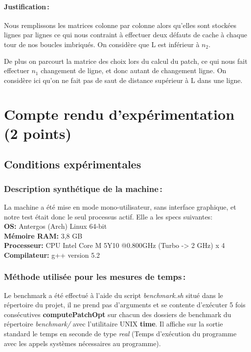 \documentclass[a4paper, 10pt, french]{article}
\begin{document}
    \paragraph{Justification\,: }
    Nous remplissons les matrices colonne par colonne alors qu'elles sont stockées lignes par lignes ce qui nous contraint à effectuer deux défauts de cache à chaque tour de nos boucles imbriqués. On considère que L est inférieur à $n_2$.

    De plus on parcourt la matrice des choix lors du calcul du patch, ce qui nous fait effectuer $n_1$ changement de ligne, et donc autant de changement ligne. On considère ici qu'on ne fait pas de saut de distance supérieur à L dans une ligne.

\section{Compte rendu d'expérimentation (2 points)}
  \subsection{Conditions expérimentales}

    \subsubsection{Description synthétique de la machine\,:}
    La machine a été mise en mode mono-utilisateur, sans interface graphique, et notre test était donc le seul processus actif. Elle a les specs suivantes: \\
    \textbf{OS:} Antergos (Arch) Linux 64-bit\\
    \textbf{Mémoire RAM:} 3,8 GB\\
    \textbf{Processeur:} CPU Intel Core M 5Y10 @0.800GHz (Turbo -> 2 GHz) x 4\\
    \textbf{Compilateur:} g++ version 5.2\\

    \subsubsection{Méthode utilisée pour les mesures de temps\,: }
    Le benchmark a été effectué à l'aide du script \textit{benchmark.sh} situé dans le répertoire du projet, il ne prend pas d'arguments et se contente d'exécuter 5 fois consécutives \textbf{computePatchOpt} sur chacun des dossiers de benchmark du répertoire \textit{benchmark/} avec l'utilitaire UNIX \textbf{time}. Il affiche sur la sortie standard le temps en seconde de type \textit{real} (Temps d'exécution du programme avec les appels systèmes nécessaires au programme).
\end{document}
